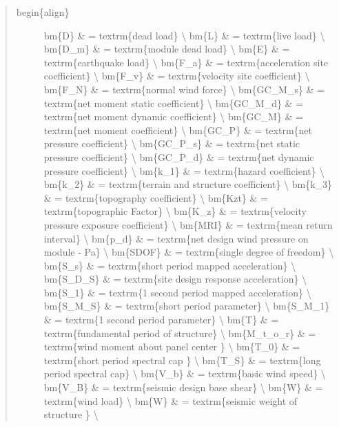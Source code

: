 \documentclass[12pt,notitle,letterpaper]{report}
\begin{document}
\begin{quote}
\begin{description}
\item[{begin\{align\}}] 
bm\{D\}       \& = textrm\{dead load\}                               \textbackslash{}
bm\{L\}       \& = textrm\{live load\}                               \textbackslash{}
bm\{D\_m\}     \& = textrm\{module dead load\}                        \textbackslash{}
bm\{E\}       \& = textrm\{earthquake load\}                         \textbackslash{}
bm\{F\_a\}     \& = textrm\{acceleration site coefficient\}           \textbackslash{}
bm\{F\_v\}     \& = textrm\{velocity site coefficient\}               \textbackslash{}
bm\{F\_N\}     \& = textrm\{normal wind force\}                       \textbackslash{}
bm\{GC\_M\_s\}  \& = textrm\{net moment static coefficient\}           \textbackslash{}
bm\{GC\_M\_d\}  \& = textrm\{net moment dynamic coefficient\}          \textbackslash{}
bm\{GC\_M\}    \& = textrm\{net moment coefficient\}                  \textbackslash{}
bm\{GC\_P\}    \& = textrm\{net pressure coefficient\}                \textbackslash{}
bm\{GC\_P\_s\}  \& = textrm\{net static pressure coefficient\}         \textbackslash{}
bm\{GC\_P\_d\}  \& = textrm\{net dynamic pressure coefficient\}        \textbackslash{}
bm\{k\_1\}     \& = textrm\{hazard coefficient\}                      \textbackslash{}
bm\{k\_2\}     \& = textrm\{terrain and structure coefficient\}       \textbackslash{}
bm\{k\_3\}     \& = textrm\{topography coefficient\}                  \textbackslash{}
bm\{Kzt\}     \& = textrm\{topographic Factor\}                      \textbackslash{}
bm\{K\_z\}     \& = textrm\{velocity pressure exposure coefficient\}  \textbackslash{}
bm\{MRI\}     \& = textrm\{mean return interval\}                    \textbackslash{}
bm\{p\_d\}     \& = textrm\{net design wind pressure on module - Pa\} \textbackslash{}
bm\{SDOF\}    \& = textrm\{single degree of freedom\}                \textbackslash{}
bm\{S\_s\}     \& = textrm\{short period mapped acceleration\}        \textbackslash{}
bm\{S\_D\_S\}   \& = textrm\{site design response acceleration\}       \textbackslash{}
bm\{S\_1\}     \& = textrm\{1 second period mapped acceleration\}     \textbackslash{}
bm\{S\_M\_S\}   \& = textrm\{short period parameter\}                  \textbackslash{}
bm\{S\_M\_1\}   \& = textrm\{1 second period parameter\}               \textbackslash{}
bm\{T\}       \& = textrm\{fundamental period of structure\}         \textbackslash{}
bm\{M\_t\_o\_r\} \& = textrm\{wind moment about panel center \}         \textbackslash{}
bm\{T\_0\}     \& = textrm\{short period spectral cap \}              \textbackslash{}
bm\{T\_S\}     \& = textrm\{long period spectral cap\}                \textbackslash{}
bm\{V\_b\}     \& = textrm\{basic wind speed\}                        \textbackslash{}
bm\{V\_B\}     \& = textrm\{seismic design base shear\}               \textbackslash{}
bm\{W\}       \& = textrm\{wind load\}                               \textbackslash{}
bm\{W\}       \& = textrm\{seismic weight of structure \}            \textbackslash{}


\end{description}
\end{quote}
\end{document}
